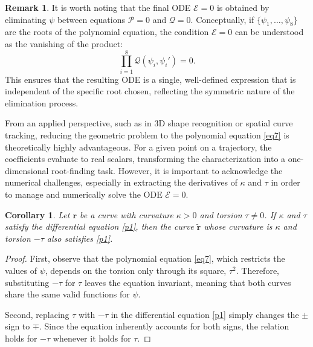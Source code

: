 \documentclass[a4paper,12pt]{amsart}
\theoremstyle{plain}
\newtheorem{corollary}[theorem]{Corollary}
\theoremstyle{definition}
\newtheorem{remark}[theorem]{Remark}
\newcommand{\bfr}{\mathbf{r}}
\begin{document}
 

 \begin{remark}
It is worth noting that the final ODE $\mathcal{E} = 0$ is obtained by eliminating $\psi$ between equations $\mathcal{P} = 0$ and $\mathcal{Q} = 0$. Conceptually, if $\{\psi_1, \dots, \psi_8\}$ are the roots of the polynomial equation, the condition $\mathcal{E} = 0$ can be understood as the vanishing of the product:
\begin{equation*}
\prod_{i=1}^{8} \mathcal{Q}(\psi_i, \psi_i') = 0.
\end{equation*}
This ensures that the resulting ODE is a single, well-defined expression that is independent of the specific root chosen, reflecting the symmetric nature of the elimination process.
\end{remark}

 
From an applied perspective, such as in 3D shape recognition or spatial curve tracking, reducing the geometric problem to the polynomial equation \eqref{eq7} is theoretically highly advantageous. For a given point on 
a trajectory, the coefficients evaluate to real scalars, transforming the characterization into a one-dimensional root-finding task. However, it is important to acknowledge the numerical challenges, especially in extracting   the derivatives of $\kappa$ and $\tau$ in order to manage and numerically solve the ODE $\mathcal{E}=0$.


 


\begin{corollary} Let $\bfr$ be a curve with curvature $\kappa>0$ and torsion $\tau\not=0$. If $\kappa$ and $\tau$ satisfy the differential equation \eqref{p1}, then the curve $\tilde{\bfr}$ whose curvature is $\kappa$ and torsion $-\tau$ also satisfies \eqref{p1}.
\end{corollary}

\begin{proof}
First, observe that the polynomial equation \eqref{eq7}, which restricts the values of $\psi$, depends on the torsion only through its square, $\tau^2$. Therefore, substituting $-\tau$ for $\tau$ leaves the equation invariant, meaning that both curves share the same valid functions for $\psi$.

Second, replacing $\tau$ with $-\tau$ in the differential equation \eqref{p1} simply changes the $\pm$ sign to $\mp$. Since the equation inherently accounts for both signs, the relation holds for $-\tau$ whenever it holds for $\tau$. 
\end{proof}
 
\end{document}
